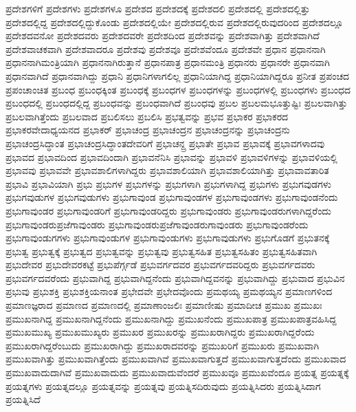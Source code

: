 {ಪ್ರದೇಶಗಳಿಗೆ
ಪ್ರದೇಶಗಳು
ಪ್ರದೇಶಗಳೂ
ಪ್ರದೇಶದ
ಪ್ರದೇಶದಕ್ಕೆ
ಪ್ರದೇಶದಲಿ
ಪ್ರದೇಶದಲ್ಲಿ
ಪ್ರದೇಶದಲ್ಲಿತ್ತು
ಪ್ರದೇಶದಲ್ಲಿದ್ದ
ಪ್ರದೇಶದಲ್ಲಿದ್ದುಕೊಂಡು
ಪ್ರದೇಶದಲ್ಲಿಯೇ
ಪ್ರದೇಶದಲ್ಲಿರುವ
ಪ್ರದೇಶದಲ್ಲಿರುವುದರಿಂದ
ಪ್ರದೇಶದಲ್ಲೂ
ಪ್ರದೇಶದವನೋ
ಪ್ರದೇಶದವರು
ಪ್ರದೇಶದವರೇ
ಪ್ರದೇಶದಿಂದ
ಪ್ರದೇಶವನ್ನು
ಪ್ರದೇಶವಾಗಿತ್ತು
ಪ್ರದೇಶವಾಗಿದೆ
ಪ್ರದೇಶವಾಚಕವಾಗಿ
ಪ್ರದೇಶವಾದರೂ
ಪ್ರದೇಶವು
ಪ್ರದೇಶವೂ
ಪ್ರದೇಶವೆಂದೂ
ಪ್ರದೇಶವೇ
ಪ್ರಧಾನ
ಪ್ರಧಾನನಾಗಿ
ಪ್ರಧಾನನಾಗಿಮಂತ್ರಿಯಾಗಿ
ಪ್ರಧಾನನಾಗಿರುತ್ತಾನೆ
ಪ್ರಧಾನಪಾತ್ರ
ಪ್ರಧಾನಮಂತ್ರಿ
ಪ್ರಧಾನರು
ಪ್ರಧಾನರೇ
ಪ್ರಧಾನವಾಗಿ
ಪ್ರಧಾನವಾಗಿದೆ
ಪ್ರಧಾನವಾಗಿದ್ದು
ಪ್ರಧಾನಿ
ಪ್ರಧಾನಿಗಳಾಗಲಿಲ್ಲ
ಪ್ರಧಾನಿಯಾಗಿದ್ದ
ಪ್ರಧಾನಿಯಾಗಿದ್ದರೂ
ಪ್ರನೀತ
ಪ್ರಪಂಚದ
ಪ್ರಪಂಚಾಂಚಿತ
ಪ್ರಬಂಧ
ಪ್ರಬಂಧಕ್ಕಿಂತ
ಪ್ರಬಂಧಕ್ಕೆ
ಪ್ರಬಂಧಗಳ
ಪ್ರಬಂಧಗಳನ್ನು
ಪ್ರಬಂಧಗಳಲ್ಲಿ
ಪ್ರಬಂಧಗಳು
ಪ್ರಬಂಧದ
ಪ್ರಬಂಧದಲ್ಲಿ
ಪ್ರಬಂಧದಲ್ಲಿದ್ದ
ಪ್ರಬಂಧವನ್ನು
ಪ್ರಬಂಧವಾಗಿದೆ
ಪ್ರಬಂಧವು
ಪ್ರಬಲ
ಪ್ರಬಲಮಭೂತ್ತುಷ್ಟಿಃ
ಪ್ರಬಲವಾಗಿತ್ತು
ಪ್ರಬಲವಾಗಿತ್ತೆಂದು
ಪ್ರಬಲವಾದ
ಪ್ರಬಲಿಸಲು
ಪ್ರಬಲಿಸಿ
ಪ್ರಭತ್ವವನ್ನು
ಪ್ರಭವ
ಪ್ರಭಾಕರ
ಪ್ರಭಾಕರದ
ಪ್ರಭಾಕರವೇದಾಧ್ಯಯನದ
ಪ್ರಭಾಕರ್
ಪ್ರಭಾಚಂದ್ರ
ಪ್ರಭಾಚಂದ್ರನ
ಪ್ರಭಾಚಂದ್ರನನ್ನು
ಪ್ರಭಾಚಂದ್ರನು
ಪ್ರಭಾಚಂದ್ರಸಿದ್ಧಾಂತ
ಪ್ರಭಾಚಂದ್ರಸಿದ್ಧಾಂತದೇವರಿಗೆ
ಪ್ರಭಾಚನ್ದ್ರ
ಪ್ರಭಾತೇ
ಪ್ರಭಾವ
ಪ್ರಭಾವಕ್ಕೆ
ಪ್ರಭಾವಗಳಾದವು
ಪ್ರಭಾವದ
ಪ್ರಭಾವದಿಂದ
ಪ್ರಭಾವದಿಂದಾಗಿ
ಪ್ರಭಾವನೆನಿಸಿ
ಪ್ರಭಾವನ್ನು
ಪ್ರಭಾವಳಿ
ಪ್ರಭಾವಳಿಗಳನ್ನು
ಪ್ರಭಾವಳಿಯಲ್ಲಿ
ಪ್ರಭಾವವು
ಪ್ರಭಾವವೇ
ಪ್ರಭಾವಶಾಲಿಗಳಾಗಿದ್ದರು
ಪ್ರಭಾವಶಾಲಿಯಾಗಿ
ಪ್ರಭಾವಶಾಲಿಯಾಗಿತ್ತು
ಪ್ರಭಾವಾವತಾರಿತ
ಪ್ರಭಾವಿ
ಪ್ರಭಾವಿಯಾಗಿ
ಪ್ರಭು
ಪ್ರಭುಗಳ
ಪ್ರಭುಗಳನ್ನು
ಪ್ರಭುಗಳಾಗಿ
ಪ್ರಭುಗಳಾಗಿದ್ದ
ಪ್ರಭುಗಳು
ಪ್ರಭುಗವುಡಗಳು
ಪ್ರಭುಗವುಡುಗಳ
ಪ್ರಭುಗವುಡುಗಳು
ಪ್ರಭುಗಾವುಂಡ
ಪ್ರಭುಗಾವುಂಡಗಳ
ಪ್ರಭುಗಾವುಂಡಗಳು
ಪ್ರಭುಗಾವುಂಡನೆಂದು
ಪ್ರಭುಗಾವುಂಡರ
ಪ್ರಭುಗಾವುಂಡರಿಗೆ
ಪ್ರಭುಗಾವುಂಡರಿದ್ದರು
ಪ್ರಭುಗಾವುಂಡರು
ಪ್ರಭುಗಾವುಂಡರುಗಳಾಗಿದ್ದರೆಂದು
ಪ್ರಭುಗಾವುಂಡರುಪ್ರಜೆಗಾವುಂಡರು
ಪ್ರಭುಗಾವುಂಡರುಪ್ರಜೆಗಾವುಂಡರುಗಾವುಂಡರು
ಪ್ರಭುಗಾವುಂಡರೆಂದು
ಪ್ರಭುಗಾವುಂಡುಗಗಳು
ಪ್ರಭುಗಾವುಂಡುಗಳ
ಪ್ರಭುಗಾವುಂಡುಗಳು
ಪ್ರಭುಗಾವುಡುಗಳು
ಪ್ರಭುಗೊಡಗೆ
ಪ್ರಭುತನಕ್ಕೆ
ಪ್ರಭುತ್ವ
ಪ್ರಭುತ್ವಕ್ಕೆ
ಪ್ರಭುತ್ವದ
ಪ್ರಭುತ್ವವನ್ನು
ಪ್ರಭುತ್ವವು
ಪ್ರಭುತ್ವಸಹಿತ
ಪ್ರಭುತ್ವಸಹಿತಂ
ಪ್ರಭುತ್ವಸಹಿತವಾಗಿ
ಪ್ರಭುದೇವರ
ಪ್ರಭುದೇವರಕಟ್ಟೆ
ಪ್ರಭುಪೆರ್ಗ್ಗಡೆ
ಪ್ರಭುವರ್ಗದವರ
ಪ್ರಭುವರ್ಗದವರಿದ್ದರು
ಪ್ರಭುವರ್ಗದವರು
ಪ್ರಭುವರ್ಗದವರೆಂದು
ಪ್ರಭುವಾಗಿದ್ದ
ಪ್ರಭುವಾಗಿದ್ದನೆಂದು
ಪ್ರಭುವಾಗಿದ್ದವನನ್ನು
ಪ್ರಭುವಾಗಿದ್ದು
ಪ್ರಭುವಾದ
ಪ್ರಭುವಿನ
ಪ್ರಭುವು
ಪ್ರಭುಶಕ್ತಿ
ಪ್ರಭುಶಕ್ತಿಯನಾಂತ
ಪ್ರಭೇದವೇ
ಪ್ರಭೇದವೊಂದು
ಪ್ರಮಥಯ್ಯ
ಪ್ರಮಥಯ್ಯನ
ಪ್ರಮಾಣಗಳಿಂದ
ಪ್ರಮಾಣಜ್ಞರಾದ
ಪ್ರಮಾಣದ
ಪ್ರಮಾಣದಲ್ಲಿ
ಪ್ರಮಾಣಾಂಜಲಿಃ
ಪ್ರಮಾಣೀಷು
ಪ್ರಮಾದೀಚ
ಪ್ರಮುಖ
ಪ್ರಮುಖಃ
ಪ್ರಮುಖನಾಗಿದ್ದ
ಪ್ರಮುಖನಾಗಿದ್ದನೆಂದು
ಪ್ರಮುಖನಾಗಿದ್ದು
ಪ್ರಮುಖನೆಂದು
ಪ್ರಮುಖಪಾತ್ರ
ಪ್ರಮುಖಪಾತ್ರವಹಿಸಿದ್ದ
ಪ್ರಮುಖಮುಖ್ಯ
ಪ್ರಮುಖಮುಖ್ಯರು
ಪ್ರಮುಖರ
ಪ್ರಮುಖರನ್ನು
ಪ್ರಮುಖರಾಗಿದ್ದರು
ಪ್ರಮುಖರಾಗಿದ್ದರೆಂದು
ಪ್ರಮುಖರಾಗಿದ್ದರೆಂಬುದು
ಪ್ರಮುಖರಾಗಿದ್ದು
ಪ್ರಮುಖರಾದವರನ್ನು
ಪ್ರಮುಖರಿಗೆ
ಪ್ರಮುಖರು
ಪ್ರಮುಖವಾಗಿ
ಪ್ರಮುಖವಾಗಿತ್ತು
ಪ್ರಮುಖವಾಗಿತ್ತೆಂದು
ಪ್ರಮುಖವಾಗಿವೆ
ಪ್ರಮುಖವಾಗುತ್ತದೆ
ಪ್ರಮುಖವಾಗುತ್ತದೆಂದು
ಪ್ರಮುಖವಾದ
ಪ್ರಮುಖವಾದುದಾಗಿವೆ
ಪ್ರಮುಖವಾದುದು
ಪ್ರಮುಖವಾದುವೆಂದರೆ
ಪ್ರಮುಖವೂ
ಪ್ರಮುಖವೆಂದೂ
ಪ್ರಯತ್ನ
ಪ್ರಯತ್ನಕ್ಕೆ
ಪ್ರಯತ್ನಗಳು
ಪ್ರಯತ್ನದಲ್ಲೂ
ಪ್ರಯತ್ನವನ್ನು
ಪ್ರಯತ್ನವು
ಪ್ರಯತ್ನಿಸದಿರುವುದು
ಪ್ರಯತ್ನಿಸಿದರು
ಪ್ರಯತ್ನಿಸಿದಾಗ
ಪ್ರಯತ್ನಿಸಿದೆ
}
